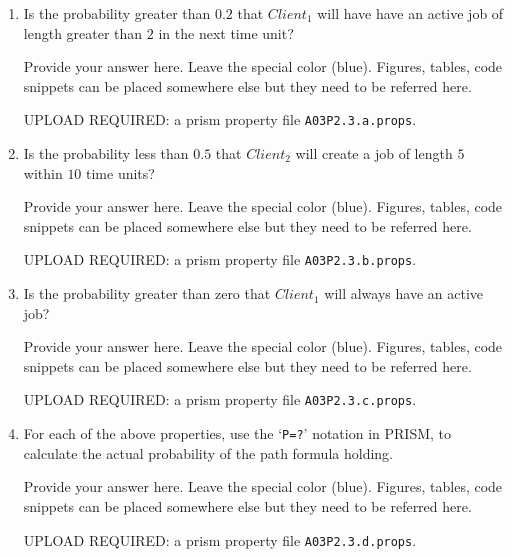 \documentclass[12pt,a4paper]{article}
\newcommand{\prismident}[1]{\mathit{#1}}
\newcommand{\Pname}[1]{\prismident{#1}}
\begin{document}
\begin{description}
\begin{enumerate}[label=\alph*)]
\item Is the probability greater than $0.2$ that $\Pname{Client}_1$ will have have an active
job of length greater than $2$ in the next time unit?
%
\ifwithanswers
\color{blue}
\par
Provide your answer here. Leave the special color (blue). Figures, tables, code snippets can be placed somewhere else but they need to be referred here.
\color{black}
\fi
\color{red} \par UPLOAD REQUIRED: a prism property file \texttt{A03P2.3.a.props}.\color{black}
%
\item Is the probability less than $0.5$ that $\Pname{Client}_2$ will create a job of length $5$ within $10$ time units?
%
\ifwithanswers
\color{blue}
\par
Provide your answer here. Leave the special color (blue). Figures, tables, code snippets can be placed somewhere else but they need to be referred here.
\color{black}
\fi
\color{red} \par UPLOAD REQUIRED: a prism property file \texttt{A03P2.3.b.props}.\color{black}
%
\item Is the probability greater than zero that $\Pname{Client}_1$ will always have an active job?
%
\ifwithanswers
\color{blue}
\par
Provide your answer here. Leave the special color (blue). Figures, tables, code snippets can be placed somewhere else but they need to be referred here.
\color{black}
\fi
\color{red} \par UPLOAD REQUIRED: a prism property file \texttt{A03P2.3.c.props}.\color{black}
%
\item For each of the above properties, use the `{\tt P=?}' notation in PRISM, to calculate the actual probability of the path
formula holding.
%
\ifwithanswers
\color{blue}
\par
Provide your answer here. Leave the special color (blue). Figures, tables, code snippets can be placed somewhere else but they need to be referred here.
\color{black}
\fi
\color{red} \par UPLOAD REQUIRED: a prism property file \texttt{A03P2.3.d.props}.\color{black}
%
\end{enumerate}

\end{description}

\clearpage
\end{document}
